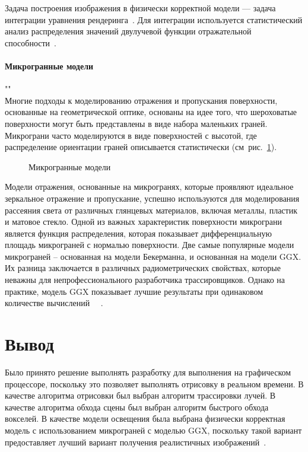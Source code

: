 Задача построения изображения в физически корректной модели --- задача 
интеграции уравнения рендеринга~\cite{EoR}. Для интеграции используется
статистический анализ распределения значений двулучевой функции отражательной 
способности~\cite{PBRT3e}.

\paragraph{Микрогранные модели}""\\
Многие подходы к моделированию отражения и пропускания поверхности, основанные 
на геометрической оптике, основаны на идее того, что шероховатые поверхности 
могут быть представлены в виде набора маленьких граней. Микрограни часто моделируются 
в виде поверхностей с высотой, где распределение ориентации граней описывается статистически 
(см~рис.~\ref{img:microfacet}).

\begin{figure}[!ht]
  \centering
  
  \caption{Микрогранные модели~\cite{PBRT3e}}
  \label{img:microfacet}
\end{figure}

Модели отражения, основанные на микрогранях, которые проявляют идеальное 
зеркальное отражение и пропускание, успешно используются для моделирования 
рассеяния света от различных глянцевых материалов, включая металлы, пластик 
и матовое стекло.
Одной из важных характеристик поверхности микрограни является функция 
распределения, которая показывает дифференциальную площадь микрограней 
с нормалью поверхности. Две самые популярные модели микрограней -- 
основанная на модели Бекерманна, и основанная на модели GGX. Их разница 
заключается в различных радиометрических свойствах, которые неважны
для непрофессионального разработчика трассировщиков. Однако на практике,
модель GGX показывает лучшие результаты при одинаковом количестве вычислений
~\cite{PBRT3e}~\cite{MMfRtRS}.

\section*{Вывод}

Было принято решение выполнять разработку для выполнения на графическом процессоре,
поскольку это позволяет выполнять отрисовку в реальном времени.
В качестве алгоритма отрисовки был выбран алгоритм трассировки лучей.
В качестве алгоритма обхода сцены был выбран алгоритм быстрого обхода вокселей.
В качестве модели освещения была выбрана физически корректная модель с использованием
микрограней с моделью GGX, поскольку такой вариант предоставляет лучший вариант
получения реалистичных изображений~\cite{MMfRtRS}.
